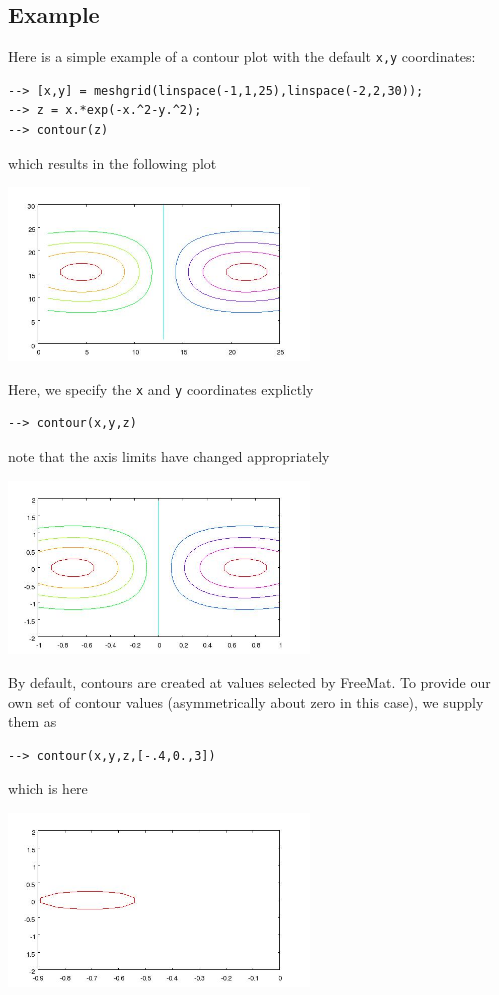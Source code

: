 \subsection{Example}

Here is a simple example of a contour plot with the default \verb|x,y|
coordinates:
\begin{verbatim}
--> [x,y] = meshgrid(linspace(-1,1,25),linspace(-2,2,30));
--> z = x.*exp(-x.^2-y.^2);
--> contour(z)
\end{verbatim}
which results in the following plot


\centerline{\includegraphics[width=8cm]{contour1}}

Here, we specify the \verb|x| and \verb|y| coordinates explictly
\begin{verbatim}
--> contour(x,y,z)
\end{verbatim}
note that the axis limits have changed appropriately


\centerline{\includegraphics[width=8cm]{contour2}}

By default, contours are created at values selected by FreeMat.  To
provide our own set of contour values (asymmetrically about zero in this
case), we supply them as
\begin{verbatim}
--> contour(x,y,z,[-.4,0.,3])
\end{verbatim}
which is here


\centerline{\includegraphics[width=8cm]{contour3}}

